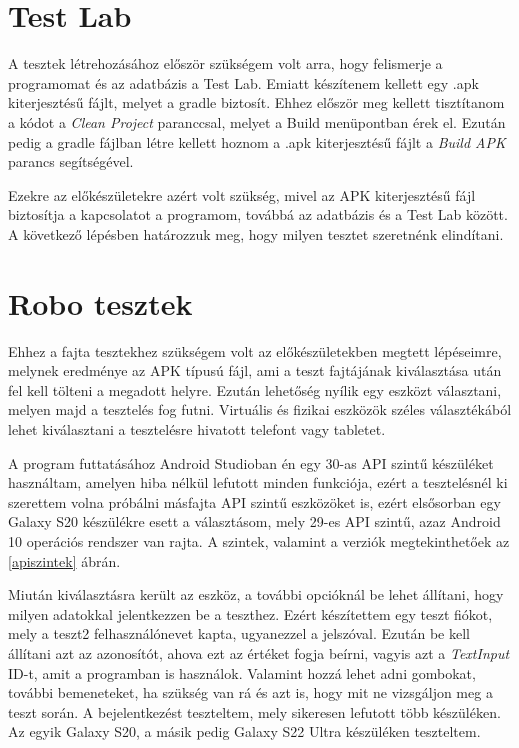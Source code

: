 \documentclass{thesis-ekf}
\begin{document}
\section{Test Lab}
A tesztek létrehozásához először szükségem volt arra, hogy felismerje a programomat és az adatbázis a Test Lab. Emiatt készítenem kellett egy .apk kiterjesztésű fájlt, melyet a gradle biztosít. Ehhez először meg kellett tisztítanom a kódot a \textit{Clean Project} paranccsal, melyet a Build menüpontban érek el. Ezután pedig a gradle fájlban létre kellett hoznom a .apk kiterjesztésű fájlt a \textit{Build APK} parancs segítségével.

Ezekre az előkészületekre azért volt szükség, mivel az APK kiterjesztésű fájl biztosítja a kapcsolatot a programom, továbbá az adatbázis és a Test Lab között. A következő lépésben határozzuk meg, hogy milyen tesztet szeretnénk elindítani.

\section{Robo tesztek}
Ehhez a fajta tesztekhez szükségem volt az előkészületekben megtett lépéseimre, melynek eredménye az APK típusú fájl, ami a teszt fajtájának kiválasztása után fel kell tölteni a megadott helyre. Ezután lehetőség nyílik egy eszközt választani, melyen majd a tesztelés fog futni. Virtuális és fizikai eszközök széles választékából lehet kiválasztani a tesztelésre hivatott telefont vagy tabletet.

A program futtatásához Android Studioban én egy 30-as API szintű készüléket használtam, amelyen hiba nélkül lefutott minden funkciója, ezért a tesztelésnél ki szerettem volna próbálni másfajta API szintű eszközöket is, ezért elsősorban egy Galaxy S20 készülékre esett a választásom, mely 29-es API szintű, azaz Android 10 operációs rendszer van rajta. A szintek, valamint a verziók megtekinthetőek az \ref{apiszintek} ábrán.

Miután kiválasztásra került az eszköz, a további opcióknál be lehet állítani, hogy milyen adatokkal jelentkezzen be a teszthez. Ezért készítettem egy teszt fiókot, mely a teszt2 felhasználónevet kapta, ugyanezzel a jelszóval. Ezután be kell állítani azt az azonosítót, ahova ezt az értéket fogja beírni, vagyis azt a \textit{TextInput} ID-t, amit a programban is használok. Valamint hozzá lehet adni gombokat, további bemeneteket, ha szükség van rá és azt is, hogy mit ne vizsgáljon meg a teszt során. A bejelentkezést teszteltem, mely sikeresen lefutott több készüléken. Az egyik Galaxy S20, a másik pedig Galaxy S22 Ultra készüléken teszteltem.
\end{document}
